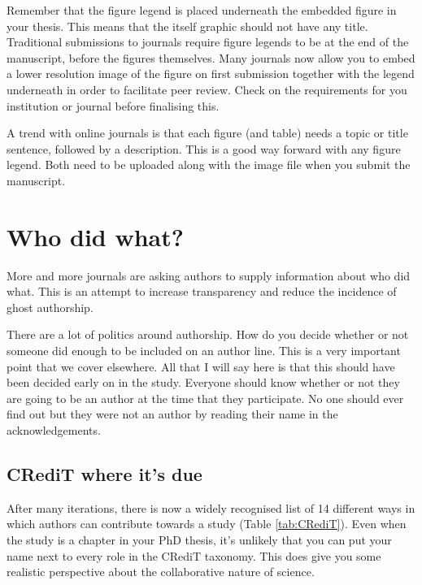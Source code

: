 \documentclass[
]{krantz}
\begin{document}
Remember that the figure legend is placed underneath the embedded figure in your thesis. This means that the itself graphic should not have any title. Traditional submissions to journals require figure legends to be at the end of the manuscript, before the figures themselves. Many journals now allow you to embed a lower resolution image of the figure on first submission together with the legend underneath in order to facilitate peer review. Check on the requirements for you institution or journal before finalising this.

A trend with online journals is that each figure (and table) needs a topic or title sentence, followed by a description. This is a good way forward with any figure legend. Both need to be uploaded along with the image file when you submit the manuscript.

\hypertarget{credit}{%
\section{Who did what?}\label{credit}}

More and more journals are asking authors to supply information about who did what. This is an attempt to increase transparency and reduce the incidence of ghost authorship.

There are a lot of politics around authorship. How do you decide whether or not someone did enough to be included on an author line. This is a very important point that we cover elsewhere. All that I will say here is that this should have been decided early on in the study. Everyone should know whether or not they are going to be an author at the time that they participate. No one should ever find out but they were not an author by reading their name in the acknowledgements.

\hypertarget{credit-where-its-due}{%
\subsection{CRediT where it's due}\label{credit-where-its-due}}

After many iterations, there is now a widely recognised list of 14 different ways in which authors can contribute towards a study (Table \ref{tab:CRediT}). Even when the study is a chapter in your PhD thesis, it's unlikely that you can put your name next to every role in the CRediT taxonomy. This does give you some realistic perspective about the collaborative nature of science.
\end{document}

